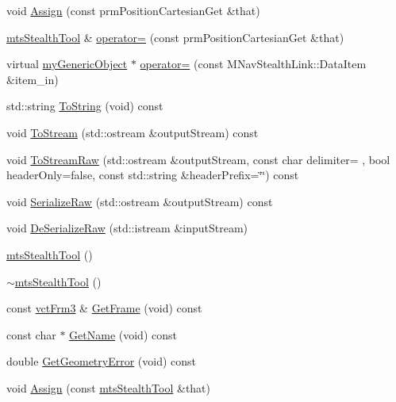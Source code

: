 \begin{DoxyCompactItemize}
void \hyperlink{classmts_stealth_tool_a371596656a661001c3691ae510dab17b}{Assign} (const prm\+Position\+Cartesian\+Get \&that)
\item 
\hyperlink{classmts_stealth_tool}{mts\+Stealth\+Tool} \& \hyperlink{classmts_stealth_tool_afd3d34f5974e9e9d182c0cf7b58b1c5e}{operator=} (const prm\+Position\+Cartesian\+Get \&that)
\item 
virtual \hyperlink{classmy_generic_object}{my\+Generic\+Object} $\ast$ \hyperlink{classmts_stealth_tool_a0e77e6a830e75276f11435b65f8fb376}{operator=} (const M\+Nav\+Stealth\+Link\+::\+Data\+Item \&item\+\_\+in)
\item 
std\+::string \hyperlink{classmts_stealth_tool_a18a31c80172f4f6280673c1db6ca8c5b}{To\+String} (void) const 
\item 
void \hyperlink{classmts_stealth_tool_a7550641c7e9eb89a5d1a77f4d48c47e9}{To\+Stream} (std\+::ostream \&output\+Stream) const 
\item 
void \hyperlink{classmts_stealth_tool_a6bfabcb3bee465c02dc9c42578dfd220}{To\+Stream\+Raw} (std\+::ostream \&output\+Stream, const char delimiter= \textquotesingle{} \textquotesingle{}, bool header\+Only=false, const std\+::string \&header\+Prefix=\char`\"{}\char`\"{}) const 
\item 
void \hyperlink{classmts_stealth_tool_a1fa41dcc1d7260a3ddd7f2d5ea7732c9}{Serialize\+Raw} (std\+::ostream \&output\+Stream) const 
\item 
void \hyperlink{classmts_stealth_tool_ad346445c8f547aac0f99e869a585d90a}{De\+Serialize\+Raw} (std\+::istream \&input\+Stream)
\item 
\hyperlink{classmts_stealth_tool_aa883de2b768f98fec69a6bc857b78323}{mts\+Stealth\+Tool} ()
\item 
\hyperlink{classmts_stealth_tool_a86b22b54518d7c3535e85e17f71d9cad}{$\sim$mts\+Stealth\+Tool} ()
\item 
const \hyperlink{vct_transformation_types_8h_a81feda0a02c2d1bc26e5553f409fed20}{vct\+Frm3} \& \hyperlink{classmts_stealth_tool_a45f638dd4baf99c685c050a87323fd82}{Get\+Frame} (void) const 
\item 
const char $\ast$ \hyperlink{classmts_stealth_tool_a99340f0661adaa23eabaf43394360164}{Get\+Name} (void) const 
\item 
double \hyperlink{classmts_stealth_tool_a83bb8e4413f625850653416e374b6fee}{Get\+Geometry\+Error} (void) const 
\item 
void \hyperlink{classmts_stealth_tool_a16fe29f2e0b33e1f2249a32c3adcae4a}{Assign} (const \hyperlink{classmts_stealth_tool}{mts\+Stealth\+Tool} \&that)

\end{DoxyCompactItemize}
